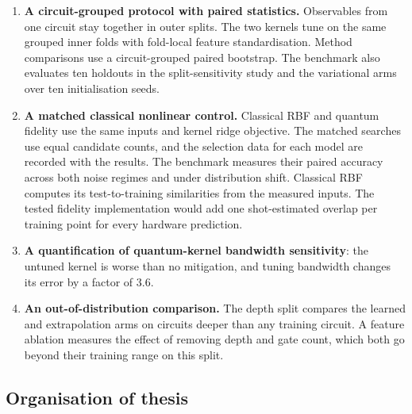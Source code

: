 \documentclass[Thesis.tex]{subfiles}
\begin{document}
\begin{enumerate}
    \item \textbf{A circuit-grouped protocol with paired statistics.} Observables
    from one circuit stay together in outer splits. The two kernels tune on the
    same grouped inner folds with fold-local feature standardisation. Method
    comparisons use a circuit-grouped paired bootstrap. The benchmark also
    evaluates ten holdouts in the split-sensitivity study and the variational arms
    over ten initialisation seeds.

    \item \textbf{A matched classical nonlinear control.} Classical RBF and
    quantum fidelity use the same inputs and kernel ridge objective. The matched
    searches use equal candidate counts, and the selection data for each model
    are recorded with the results. The benchmark
    measures their paired accuracy across both noise regimes and under distribution
    shift. Classical RBF computes its test-to-training similarities from the
    measured inputs. The tested fidelity implementation would add one
    shot-estimated overlap per training point for every hardware prediction.

    \item \textbf{A quantification of quantum-kernel bandwidth sensitivity}: the
    untuned kernel is worse than no mitigation, and tuning bandwidth changes its error
    by a factor of $3.6$.

    \item \textbf{An out-of-distribution comparison.} The depth split compares
    the learned and extrapolation arms on circuits deeper than any training
    circuit. A feature ablation measures the effect of removing depth and gate
    count, which both go beyond their training range on this split.

\end{enumerate}

\subsection{Organisation of thesis}
\end{document}
